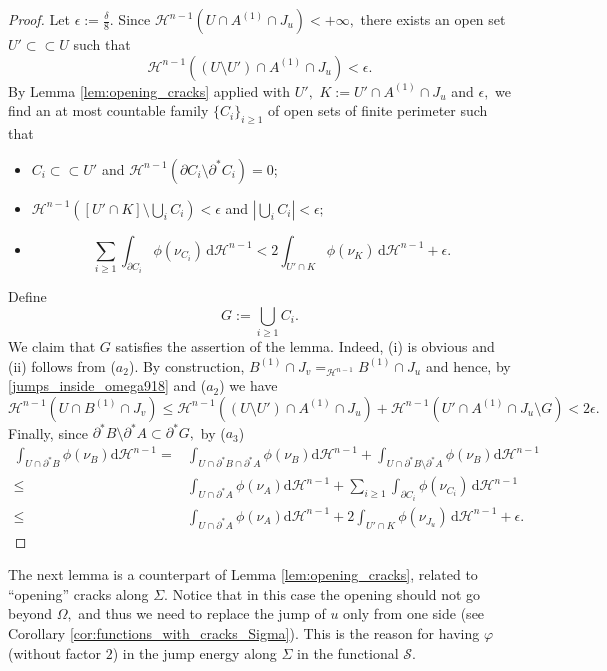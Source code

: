 \documentclass[reqno]{amsart}
\numberwithin{equation}{section}
\theoremstyle{plain}
\theoremstyle{definition}
\newcommand{\cH}{\mathcal{H}}
\newcommand{\cS}{\mathcal{S}}
\newcommand{\p}{\partial}
\renewcommand{\d}{\mathrm{d}}
\newcommand{\strictlyincluded}{\subset\subset}
\begin{document}
\begin{proof}
Let   
$
\epsilon:=\frac{\delta}{8}.
$
Since $\cH^{n-1}(U\cap A^{(1)}\cap J_u)<+\infty,$ there exists an open set $U'\strictlyincluded U$ such that 
\begin{equation}\label{jumps_inside_omega918}
\cH^{n-1}((U\setminus U')\cap A^{(1)}\cap J_u)< \epsilon. 
\end{equation}
% 
By Lemma \ref{lem:opening_cracks} applied with $U',$ $K:=U'\cap A^{(1)}\cap J_u$ and $\epsilon,$ we find an at most countable family $\{C_i\}_{i\ge1}$ of open sets of finite perimeter such that

\begin{itemize}
\item[($a_1$)] $C_i\strictlyincluded U'$ and $\cH^{n-1}(\p C_i\setminus \p^*C_i)=0$; 

\item[($a_2$)]  $\cH^{n-1}([U' \cap K]\setminus \bigcup_i C_i) < \epsilon$ and $|\bigcup_i C_i|< \epsilon;$ 

\item[($a_3$)]  
$$
\sum\limits_{i\ge1} \int_{\p C_i} \phi(\nu_{C_i})\,\d\cH^{n-1} < 2\int_{U' \cap K} \phi(\nu_{K}^{})\,\d\cH^{n-1} + \epsilon.  
$$
\end{itemize} 
%
Define 
$$
G:=\bigcup_{i\ge1} C_i.
$$
We claim that $G$ satisfies the assertion of the lemma. Indeed, (i) is obvious and (ii) follows  from ($a_2$). By construction, $B^{(1)}\cap J_v =_{\cH^{n-1}} B^{(1)}\cap J_u$ and hence, by \eqref{jumps_inside_omega918} and ($a_2$) we have
$$
\cH^{n-1}(U\cap B^{(1)}\cap J_v) \le \cH^{n-1}((U\setminus U')\cap A^{(1)}\cap J_u) + \cH^{n-1}(U'\cap A^{(1)}\cap J_u\setminus G) <2\epsilon .
$$
Finally, since $\p^*B\setminus \p^*A\subset \p^*G,$ by ($a_3$)
\begin{align*}
\int_{U\cap \p^*B} \phi(\nu_B)\d\cH^{n-1} = &
\int_{U\cap \p^*B\cap \p^*A} \phi(\nu_B)\d\cH^{n-1} +
\int_{U\cap \p^*B\setminus \p^*A} \phi(\nu_B)\d\cH^{n-1}\\
\le & \int_{U\cap \p^*A} \phi(\nu_A)\d\cH^{n-1}
+\sum\limits_{i\ge1} \int_{\p C_i} \phi(\nu_{C_i})\,\d\cH^{n-1}\\
\le & \int_{U\cap \p^*A} \phi(\nu_A)\d\cH^{n-1} + 
2\int_{U'\cap K} \phi(\nu_{J_u}^{})\,\d\cH^{n-1}   
+\epsilon.
\end{align*} 
\end{proof}

The next lemma is a counterpart of Lemma \ref{lem:opening_cracks},  related to ``opening'' cracks along $\Sigma.$ Notice that in this case the opening should not go beyond $\Omega,$ and thus  we need to replace the jump of $u$ only from one side (see Corollary \ref{cor:functions_with_cracks_Sigma}). This is the reason for having $\varphi$ (without factor $2$) in the jump energy along $\Sigma$ in the functional $\cS.$
\end{document}
